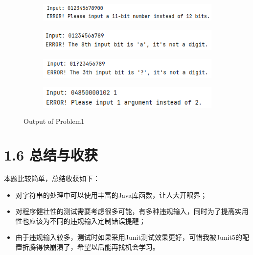 \begin{figure}[H]
	\begin{subfigure}{0.325\linewidth}
		\centering
		\includegraphics[width=1\linewidth]{../pic/1/1.6.png}
	\end{subfigure}
    \vspace{1cm}
    \begin{subfigure}{0.325\linewidth}
		\centering
		\includegraphics[width=1\linewidth]{../pic/1/1.7.png}
	\end{subfigure}
	\begin{subfigure}{0.325\linewidth}
		\centering
		\includegraphics[width=1\linewidth]{../pic/1/1.8.png}
	\end{subfigure}
	\begin{subfigure}{0.325\linewidth}
		\centering
		\includegraphics[width=1\linewidth]{../pic/1/1.9.png}
	\end{subfigure}
	\caption{Output of Problem1}
\end{figure}

\section{1.6 总结与收获}

本题比较简单，总结收获如下：
\begin{itemize}
    \item 对字符串的处理中可以使用丰富的Java库函数，让人大开眼界；
    \item 对程序健壮性的测试需要考虑很多可能，有多种违规输入，同时为了提高实用性也应该为不同的违规输入定制错误提醒；
    \item 由于违规输入较多，测试时如果采用Junit测试效果更好，可惜我被Junit5的配置折腾得快崩溃了，希望以后能再找机会学习。
\end{itemize}


